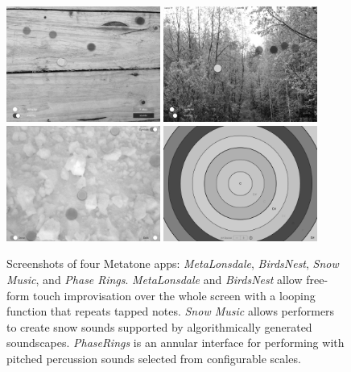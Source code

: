 \documentclass[graybox]{svmult}
\begin{document}
\begin{figure}
\begin{center}
  \includegraphics[width=0.45\textwidth]{figures/app-2-MetaLonsdale-bw}
  \includegraphics[width=0.45\textwidth]{figures/app-3-BirdsNest-bw}
  \includegraphics[width=0.45\textwidth]{figures/app-4-SnowMusic-bw}
  \includegraphics[width=0.45\textwidth]{figures/app-5-PhaseRings-bw}
\end{center}
\caption{Screenshots of four Metatone apps: \emph{MetaLonsdale},
  \emph{BirdsNest}, \emph{Snow Music}, and \emph{Phase Rings}.
  \emph{MetaLonsdale} and \emph{BirdsNest} allow free-form touch
  improvisation over the whole screen with a looping function that
  repeats tapped notes. \emph{Snow Music} allows performers to create
  snow sounds supported by algorithmically generated soundscapes.
  \emph{PhaseRings} is an annular interface for performing with
  pitched percussion sounds selected from configurable scales.}
\label{fig:metatone-apps}
\end{figure}
\end{document}
